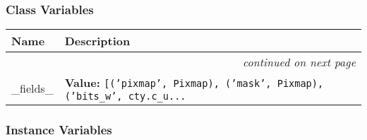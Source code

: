 
  \subsubsection{Class Variables}

    \vspace{-1cm}
\hspace{\varindent}\begin{longtable}{|p{\varnamewidth}|p{\vardescrwidth}|l}
\cline{1-2}
\cline{1-2} \centering \textbf{Name} & \centering \textbf{Description}& \\
\cline{1-2}
\endhead\cline{1-2}\multicolumn{3}{r}{\small\textit{continued on next page}}\\\endfoot\cline{1-2}
\endlastfoot\raggedright \_\-f\-i\-e\-l\-d\-s\-\_\- & \raggedright \textbf{Value:} 
{\tt [('pixmap', Pixmap), ('mask', Pixmap), ('bits\_w', cty.c\_u\texttt{...}}&\\
\cline{1-2}
\end{longtable}



  \subsubsection{Instance Variables}

